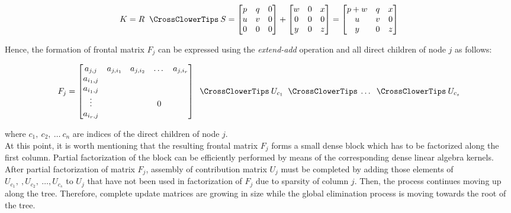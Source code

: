 \begin{equation} \label{eq:mm-8}
K = R \extendadd S = \begin{bmatrix}
p & q & 0 \\
u & v & 0 \\
0 & 0 & 0 \\
\end{bmatrix} 
+
\begin{bmatrix}
w & 0 & x \\
0 & 0 & 0 \\
y & 0 & z \\
\end{bmatrix} 
=
\begin{bmatrix}
p + w & q & x \\
u & v & 0 \\
y & 0 & z \\
\end{bmatrix} 
\end{equation}

Hence, the formation of frontal matrix $F_{j}$ can be expressed using the \textit{extend-add} operation and all direct children of node $j$ as follows:


\begin{equation} \label{eq:mm-9}
	F_{j} = \begin{bmatrix}a_{j,j} & a_{j,i_1} & a_{j,i_2} & \dots & a_{j,i_r} \\
a_{i_1,j} \\
a_{i_1,j} \\
\vdots & & & 0\\
a_{i_r,j} \\
\end{bmatrix} \extendadd U_{c_1} \extendadd \dots \extendadd U_{c_s} 
\end{equation}

where $c_{1}, \: c_{2}, \: \dots \: c_{n}$ are indices of the direct children of node $j$.\\

At this point, it is worth mentioning that the resulting frontal matrix $F_{j}$ forms a small dense block which has to be factorized along the first column. Partial factorization of the block can be efficiently performed by means of the corresponding dense linear algebra kernels.\\


After partial factorization of matrix $F_{j}$, assembly of contribution matrix $U_{j}$ must be completed by adding those elements of $U_{c_1}, \:, U_{c_2}, \: \dots, U_{c_s}$ to $U_{j}$ that have not been used in factorization of $F_{j}$ due to sparsity of column $j$. Then, the process continues moving up along the tree. Therefore, complete update matrices are growing in size while the global elimination process is moving towards the root of the tree.\\


